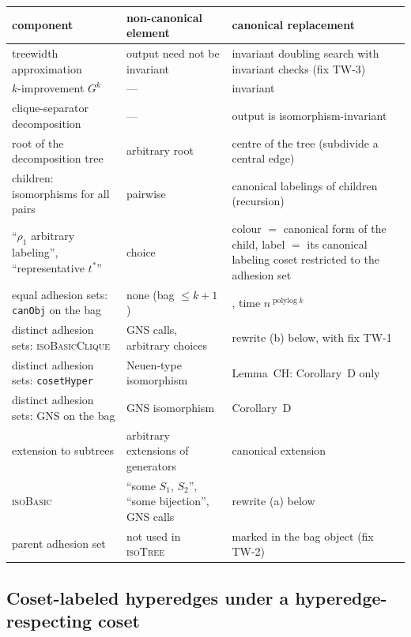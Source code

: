 \documentclass[11pt]{article}
\theoremstyle{plain}
\theoremstyle{definition}
\theoremstyle{remark}
\theoremstyle{named}
\theoremstyle{namedrm}
\newcommand{\polylog}{\operatorname{polylog}}
\begin{document}
\begin{center}\small
\begin{tabularx}{\linewidth}{@{}L{4cm}L{3.2cm}Y@{}}
\toprule
component & non-canonical element & canonical replacement\\
\midrule
treewidth approximation \cite{Amir01} & output need not be invariant & invariant doubling search with invariant checks (fix TW-3)\\
$k$-improvement $G^k$ & --- & invariant \cite[Lemma~29]{Wie20}\\
clique-separator decomposition & --- & output is isomorphism-invariant \cite[Thm.~30]{Wie20}\\
root of the decomposition tree & arbitrary root & centre of the tree (subdivide a central edge)\\
children: isomorphisms for all pairs & pairwise & canonical labelings of children (recursion)\\
``$\rho_1$ arbitrary labeling'', ``representative $t^*$'' & choice & colour $=$ canonical form of the child, label $=$ its canonical labeling coset restricted to the adhesion set \cite[\S6.1.3]{Wie21}\\
equal adhesion sets: \texttt{canObj} on the bag & none (bag $\le k+1$) & \cite[Cor.~27]{Wie20}, time $n^{\polylog k}$\\
distinct adhesion sets: \textsc{isoBasicClique} & GNS calls, arbitrary choices & rewrite (b) below, with fix TW-1\\
distinct adhesion sets: \texttt{cosetHyper} & Neuen-type isomorphism & Lemma~CH: Corollary~D only\\
distinct adhesion sets: GNS on the bag & GNS isomorphism & Corollary~D\\
extension to subtrees & arbitrary extensions of generators & canonical extension \cite[pp.~145--152]{Wie21}\\
\textsc{isoBasic} & ``some $S_1$, $S_2$'', ``some bijection'', GNS calls & rewrite (a) below\\
parent adhesion set & not used in \textsc{isoTree} & marked in the bag object (fix TW-2)\\
\bottomrule
\end{tabularx}
\end{center}

\subsection{Coset-labeled hyperedges under a hyperedge-respecting coset}
\end{document}
